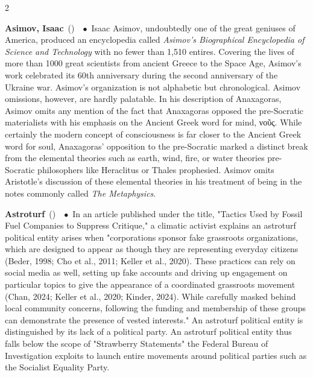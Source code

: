 \documentclass[10pt,a4paper,twoside]{article} %
\newcommand{\entry}[4]{\markboth{#1}{#1}\textbf{#1}\ {(#2)}\ \textit{#3}\ $\bullet$\ {#4}}  %
\begin{document}
\begin{multicols}{2}
\entry{Asimov, Isaac} {} {} {Isaac Asimov, undoubtedly one of the great geniuses of America, produced an encyclopedia called \emph{Asimov's Biographical Encyclopedia of Science and Technology} with no fewer than 1,510 entires. Covering the lives of more than 1000 great scientists from ancient Greece to the Space Age, Asimov's work celebrated its 60th anniversary during the second anniversary of the Ukraine war. Asimov's organization is not alphabetic but chronological. \newline \indent Asimov omissions, however, are hardly palatable. In his description of Anaxagoras, Asimov omits any mention of the fact that Anaxagoras opposed the pre-Socratic materialists with his emphasis on the Ancient Greek word for mind, \textgreek{νοῦς}. While certainly the modern concept of consciousness is far closer to the Ancient Greek word for soul, Anaxagoras' opposition to the pre-Socratic marked a distinct break from the elemental theories such as earth, wind, fire, or water theories pre-Socratic philosophers like Heraclitus or Thales prophesied. Asimov omits Aristotle's discussion of these elemental theories in his treatment of being in the notes commonly called \emph{The Metaphysics}.}

\entry{Astroturf} {} {} {In an article published under the title, "Tactics Used by Fossil Fuel Companies to Suppress Critique," a climatic activist explains an astroturf political entity arises when "corporations sponsor fake grassroots organizations, which are designed to appear as though they are representing everyday citizens (Beder, 1998; Cho et al., 2011; Keller et al., 2020). These practices can rely on social media as well, setting up fake accounts and driving up engagement on particular topics to give the appearance of a coordinated grassroots movement (Chan, 2024; Keller et al., 2020; Kinder, 2024). While carefully masked behind local community concerns, following the funding and membership of these groups can demonstrate the presence of vested interests." An astroturf political entity is distinguished by its lack of a political party. An astroturf political entity thus falls below the scope of "Strawberry Statements" the Federal Bureau of Investigation exploits to launch entire movements around political parties such as the Socialist Equality Party. }




\end{multicols}
\end{document}
